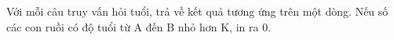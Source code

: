 Với mỗi câu truy vấn hỏi tuổi, trả về kết quả tương ứng trên một dòng. Nếu số các con ruồi có độ tuổi từ A đến B nhỏ hơn K, in ra 0.  

\